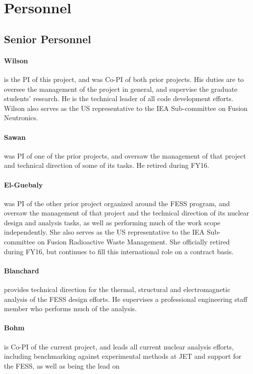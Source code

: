 \section{Personnel}

\subsection{Senior Personnel}
\paragraph{Wilson} is the PI of this project, and was Co-PI of both
prior projects.  His duties are to oversee the management of the project in
general, and supervise the graduate students' research.  He is the technical
leader of all code development efforts.  Wilson also serves as the US
representative to the IEA Sub-committee on Fusion Neutronics.

\paragraph{Sawan} was PI of one of the prior projects, and oversaw the
management of that project and technical direction of some of its tasks.  He
retired during FY16.

\paragraph{El-Guebaly} was PI of the other prior project organized around the
\gls{FESS} program, and oversaw the management of that project and the
technical direction of its nuclear design and analysis tasks, as well as
performing much of the work scope independently.  She also serves as the US
representative to the IEA Sub-committee on Fusion Radioactive Waste Management.
She officially retired during FY16, but continues to fill this international
role on a contract basis.

\paragraph{Blanchard} provides technical direction for the thermal, structural
and electromagnetic analysis of the \gls{FESS} design efforts.  He supervises
a professional engineering staff member who performs much of the analysis.

\paragraph{Bohm} is Co-PI of the current project, and leads all current
nuclear analysis efforts, including benchmarking against experimental methods
at JET and support for the \gls{FESS}, as well as being the lead on 

